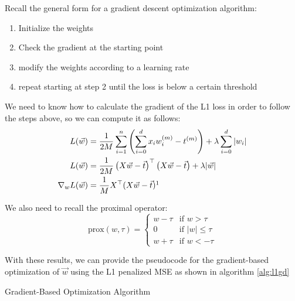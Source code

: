 Recall the general form for a gradient descent optimization algorithm:
\begin{enumerate}
  \item Initialize the weights
  \item Check the gradient at the starting point
  \item modify the weights according to a learning rate
  \item repeat starting at step 2 until the loss is below a certain threshold
\end{enumerate}
We need to know how to calculate the gradient of the L1 loss in order to follow the steps above, so we can compute it as follows:
\begin{align*}
  L(\vec{w}) &= \frac{1}{2M} \sum_{i=1}^{n} \left(\sum_{i=0}^{d}x_i w_{i}^{(m)} - t^{(m)}\right) + \lambda \sum_{i=0}^{d}|w_{i}| \\
  L(\vec{w}) &= \frac{1}{2M} \left(X\vec{w} - \vec{t}\right)^{\top}\left(X\vec{w} - \vec{t}\right) + \lambda |\vec{w}| \\
  \nabla_{w}L(\vec{w}) &= \frac{1}{M}X^{\top}(X\vec{w}-\vec{t})\footnote{Recall our discussion on proximal methods. We only need to care about the MSE term for our gradient descent}
\end{align*}

We also need to recall the proximal operator:
\[
\text{prox}(w, \tau) =
\begin{cases}
w - \tau & \text{if } w > \tau \\
0 & \text{if } |w| \leq \tau \\
w + \tau & \text{if } w < -\tau
\end{cases}
\]

With these results, we can provide the pseudocode for the gradient-based optimization of $\vec{w}$ using the L1 penalized MSE as shown in algorithm \ref{alg:l1gd}

\begin{algorithm}
\caption{Gradient-Based Optimization Algorithm}\label{alg:l1gd}
\end{algorithm}
